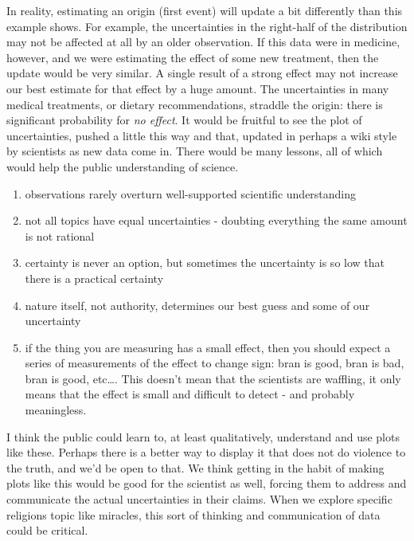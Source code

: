 In reality, estimating an origin (first event) will update a bit
differently than this example shows. For example, the uncertainties in
the right-half of the distribution may not be affected at all by an
older observation. If this data were in medicine, however, and we were
estimating the effect of some new treatment, then the update would be
very similar. A single result of a strong effect may not increase our
best estimate for that effect by a huge amount. The uncertainties in
many medical treatments, or dietary recommendations, straddle the
origin: there is significant probability for \emph{no effect}. It would
be fruitful to see the plot of uncertainties, pushed a little this way
and that, updated in perhaps a wiki style by scientists as new data come
in. There would be many lessons, all of which would help the public
understanding of science.

\begin{enumerate}
\def\labelenumi{\arabic{enumi}.}
\itemsep1pt\parskip0pt
\item
  observations rarely overturn well-supported scientific understanding
\item
  not all topics have equal uncertainties - doubting everything the same
  amount is not rational
\item
  certainty is never an option, but sometimes the uncertainty is so low
  that there is a practical certainty
\item
  nature itself, not authority, determines our best guess and some of
  our uncertainty
\item
  if the thing you are measuring has a small effect, then you should
  expect a series of measurements of the effect to change sign: bran is
  good, bran is bad, bran is good, etc\ldots{}. This doesn't mean that
  the scientists are waffling, it only means that the effect is small
  and difficult to detect - and probably meaningless.
\end{enumerate}

I think the public could learn to, at least qualitatively, understand
and use plots like these. Perhaps there is a better way to display it
that does not do violence to the truth, and we'd be open to that.  We think getting in the habit of making plots like this would be good for the
scientist as well, forcing them to address and communicate the actual
uncertainties in their claims.  When we explore specific religions topic like miracles, this sort of thinking and communication of data could be critical.

